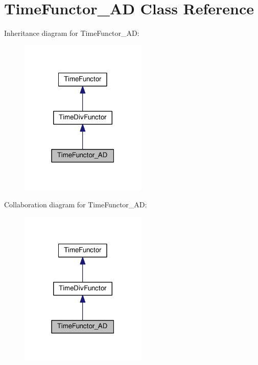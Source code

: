 \hypertarget{classTimeFunctor__AD}{}\section{Time\+Functor\+\_\+\+AD Class Reference}
\label{classTimeFunctor__AD}


Inheritance diagram for Time\+Functor\+\_\+\+AD\+:
\nopagebreak
\begin{figure}[H]
\begin{center}
\leavevmode
\includegraphics[width=171pt]{classTimeFunctor__AD__inherit__graph}
\end{center}
\end{figure}


Collaboration diagram for Time\+Functor\+\_\+\+AD\+:
\nopagebreak
\begin{figure}[H]
\begin{center}
\leavevmode
\includegraphics[width=171pt]{classTimeFunctor__AD__coll__graph}
\end{center}
\end{figure}
